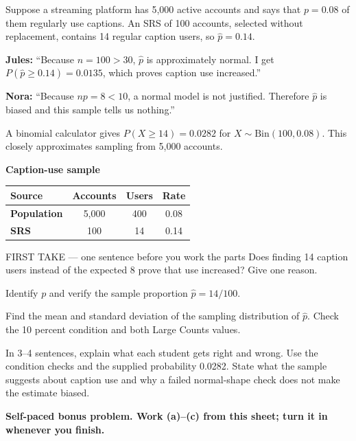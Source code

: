\documentclass[14pt]{extarticle}
\begin{document}
\pagestyle{empty}


\noindent\begin{minipage}[t]{0.57\linewidth}
\vspace{0pt}
Suppose a streaming platform has 5,000 active accounts and says that $p=0.08$ of them regularly use captions. An SRS of 100 accounts, selected without replacement, contains 14 regular caption users, so $\widehat p=0.14$.\par\smallskip \textbf{Jules:} ``Because $n=100>30$, $\widehat p$ is approximately normal. I get $P(\widehat p\geq0.14)=0.0135$, which proves caption use increased.''\par \textbf{Nora:} ``Because $np=8<10$, a normal model is not justified. Therefore $\widehat p$ is biased and this sample tells us nothing.''\par\smallskip A binomial calculator gives $P(X\geq14)=0.0282$ for $X\sim\mathrm{Bin}(100,0.08)$. This closely approximates sampling from 5,000 accounts.\par
\end{minipage}\hfill
\begin{minipage}[t]{0.40\linewidth}
\vspace{0pt}
\begin{center}
\textbf{Caption-use sample}\par\smallskip
\begin{tabular}{|l|c|c|c|}
\hline
\textbf{Source} & \textbf{Accounts} & \textbf{Users} & \textbf{Rate} \\ \hline
\textbf{Population} & 5,000 & 400 & 0.08 \\ \hline
\textbf{SRS} & 100 & 14 & 0.14 \\ \hline
\end{tabular}
\end{center}
\end{minipage}

\begin{firsttakebox}{FIRST TAKE --- one sentence before you work the parts}
Does finding 14 caption users instead of the expected 8 prove that use increased? Give one reason.
\end{firsttakebox}

\begin{description}[leftmargin=1.15in, labelwidth=1in, itemsep=2pt, topsep=2pt]
  \item[\dokbadge{1}~(a)] Identify $p$ and verify the sample proportion $\widehat p=14/100$.
  \item[\dokbadge{2}~(b)] Find the mean and standard deviation of the sampling distribution of $\widehat p$. Check the 10 percent condition and both Large Counts values.
  \item[\dokbadge{3}~(c)] In 3--4 sentences, explain what each student gets right and wrong. Use the condition checks and the supplied probability 0.0282. State what the sample suggests about caption use and why a failed normal-shape check does not make the estimate biased.
\end{description}

\vfill
\textbf{Self-paced bonus problem. Work (a)--(c) from this sheet; turn it in whenever you finish.}
\end{document}
